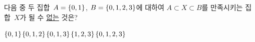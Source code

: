 다음 중 두 집합~$A=\{0{,}\mkern3mu\mathopen{}1\}$, $B=\{0{,}\mkern3mu\mathopen{}1{,}\mkern3mu\mathopen{}2{,}\mkern3mu\mathopen{}3\}$에 대하여 $A\subset X\subset B$를 만족시키는 집합~$X$가 될 수 \underline{없는} 것은?
\begin{choices32}{$\{0{,}\mkern3mu\mathopen{}1\}$}{$\{0{,}\mkern3mu\mathopen{}1{,}\mkern3mu\mathopen{}2\}$}{$\{0{,}\mkern3mu\mathopen{}1{,}\mkern3mu\mathopen{}3\}$}{$\{1{,}\mkern3mu\mathopen{}2{,}\mkern3mu\mathopen{}3\}$}{$\{0{,}\mkern3mu\mathopen{}1{,}\mkern3mu\mathopen{}2{,}\mkern3mu\mathopen{}3\}$}\end{choices32}
